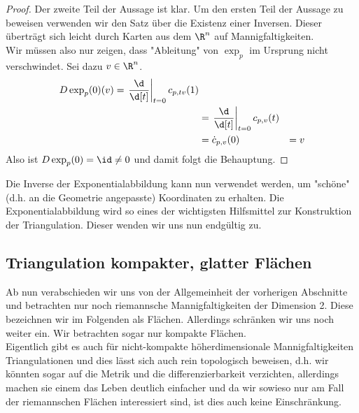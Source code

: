 \begin{proof}
  Der zweite Teil der Aussage ist klar. Um den ersten Teil der Aussage zu beweisen verwenden wir den Satz über die Existenz einer Inversen. Dieser überträgt sich leicht durch Karten aus dem $\R^n$ auf Mannigfaltigkeiten. \\
  Wir müssen also nur zeigen, dass "Ableitung" von $\exp_p$ im Ursprung nicht verschwindet. Sei dazu $v \in \R^n$.
  \begin{align*}
    D \exp_p (0) (v) = \left . \frac{\d}{\d[t]} \right |_{t=0} c_{p, tv}(1) \\
    & = \left . \frac{\d}{\d[t]} \right |_{t=0} c_{p,v}(t) \\
    & = \dot c_{p,v}(0)
    & = v
  \end{align*}
  Also ist $D \exp_p (0) = \id \neq 0$ und damit folgt die Behauptung.
\end{proof}

Die Inverse der Exponentialabbildung kann nun verwendet werden, um "schöne" (d.h. an die Geometrie angepasste) Koordinaten zu erhalten. Die Exponentialabbildung wird so eines der wichtigsten Hilfsmittel zur Konstruktion der Triangulation. Dieser wenden wir uns nun endgültig zu.

\subsection{Triangulation kompakter, glatter Flächen}
Ab nun verabschieden wir uns von der Allgemeinheit der vorherigen Abschnitte und betrachten nur noch riemannsche Mannigfaltigkeiten der Dimension 2. Diese bezeichnen wir im Folgenden als Flächen. Allerdings schränken wir uns noch weiter ein. Wir betrachten sogar nur kompakte Flächen. \\
Eigentlich gibt es auch für nicht-kompakte höherdimensionale Mannigfaltigkeiten Triangulationen und dies lässt sich auch rein topologisch beweisen, d.h. wir könnten sogar auf die Metrik und die differenzierbarkeit verzichten, allerdings machen sie einem das Leben deutlich einfacher und da wir sowieso nur am Fall der riemannschen Flächen interessiert sind, ist dies auch keine Einschränkung.
